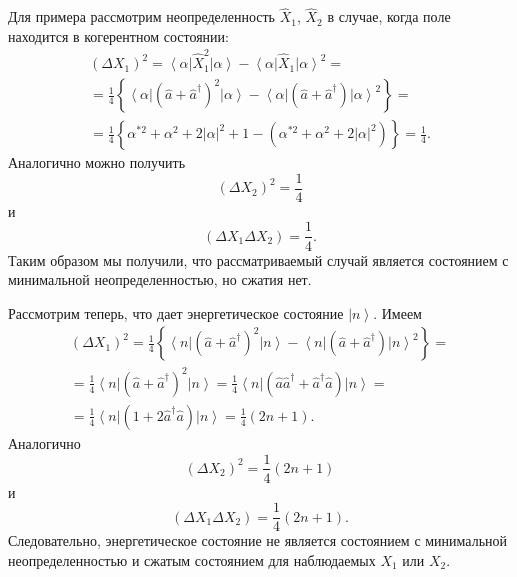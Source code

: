 Для примера рассмотрим неопределенность $\hat{X}_1$, 
$\hat{X}_2$ в случае, когда поле находится в когерентном состоянии:
\begin{eqnarray}
\left(\Delta X_1\right)^2 = 
\left<\alpha\right|\hat{X}_1^2\left|\alpha\right> - 
\left<\alpha\right|\hat{X}_1\left|\alpha\right>^2 = 
\nonumber \\
=\frac{1}{4}
\left\{
\left<\alpha\right|\left(\hat{a} +
\hat{a}^{\dag}\right)^2\left|\alpha\right> -  
\left<\alpha\right|\left(\hat{a} +
\hat{a}^{\dag}\right)\left|\alpha\right>^2 
\right\} = 
\nonumber \\
=\frac{1}{4}
\left\{
\alpha^{*2} + \alpha^2 + 2 \left|\alpha\right|^2 + 1 - 
\left(\alpha^{*2} + \alpha^2 + 2 \left|\alpha\right|^2\right)
\right\} 
=\frac{1}{4}.
\nonumber
\end{eqnarray}
Аналогично можно получить
\begin{equation}
\left(\Delta X_2\right)^2 = \frac{1}{4}
\label{eqPart3SqueezedTaskX2Alpha_1}
\end{equation}
и
\begin{equation}
\left(\Delta X_1 \Delta X_2\right) = \frac{1}{4}.
\label{eqPart3SqueezedTaskX2Alpha_2}
\end{equation}
Таким образом мы получили, что рассматриваемый случай является
состоянием с минимальной неопределенностью, но сжатия нет.

Рассмотрим теперь, что дает энергетическое состояние
$\left|n\right>$. Имеем
\begin{eqnarray}
\left(\Delta X_1\right)^2 
=\frac{1}{4}
\left\{
\left<n\right|\left(\hat{a} +
\hat{a}^{\dag}\right)^2\left|n\right> -  
\left<n\right|\left(\hat{a} +
\hat{a}^{\dag}\right)\left|n\right>^2 
\right\} = 
\nonumber \\
=
\frac{1}{4}
\left<n\right|\left(\hat{a} +
\hat{a}^{\dag}\right)^2\left|n\right>
=
\frac{1}{4}
\left<n\right|\left(\hat{a}\hat{a}^{\dag} +
\hat{a}^{\dag}\hat{a}\right)\left|n\right> =
\nonumber \\
=
\frac{1}{4}
\left<n\right|\left(1 + 2
\hat{a}^{\dag}\hat{a}\right)\left|n\right>
=\frac{1}{4}\left(2 n + 1\right).
\nonumber
\end{eqnarray}
Аналогично
\begin{equation}
\left(\Delta X_2\right)^2 = \frac{1}{4}\left(2 n + 1\right)
\label{eqPart3SqueezedTaskX2N_1}
\end{equation}
и
\begin{equation}
\left(\Delta X_1 \Delta X_2\right) = \frac{1}{4}\left(2 n + 1\right).
\label{eqPart3SqueezedTaskX2N_2}
\end{equation}
Следовательно, энергетическое состояние не является состоянием с
минимальной неопределенностью и сжатым состоянием для наблюдаемых
$X_1$ или $X_2$.
